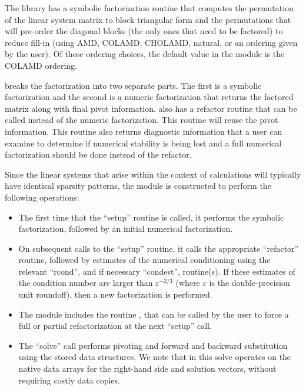 The {\klu} library has a symbolic factorization routine that computes
the permutation of the linear system matrix to block triangular form
and the permutations that will pre-order the diagonal blocks (the only
ones that need to be factored) to reduce fill-in (using AMD, COLAMD,
CHOLAMD, natural, or an ordering given by the user).  Of these
ordering choices, the default value in the {\sunlinsolklu} 
module is the COLAMD ordering.

{\klu} breaks the factorization into two separate parts.  The first is
a symbolic factorization and the second is a numeric factorization
that returns the factored matrix along with final pivot information.   
{\klu} also has a refactor routine that can be called instead of the numeric 
factorization.  This routine will reuse the pivot information.  This routine 
also returns diagnostic information that a user can examine to determine if 
numerical stability is being lost and a full numerical factorization should 
be done instead of the refactor.

Since the linear systems that arise within the context of {\sundials}
calculations will typically have identical sparsity patterns, the
{\sunlinsolklu} module is constructed to perform the
following operations:
\begin{itemize}
\item The first time that the ``setup'' routine is called, it
  performs the symbolic factorization, followed by an initial
  numerical factorization.  
\item On subsequent calls to the ``setup'' routine, it calls the
  appropriate {\klu} ``refactor'' routine, followed by estimates of
  the numerical conditioning using the relevant ``rcond'', and if
  necessary ``condest'', routine(s).  If these estimates of the
  condition number are larger than $\varepsilon^{-2/3}$ (where
  $\varepsilon$ is the double-precision unit roundoff), then a new
  factorization is performed.
\item The module includes the routine , that 
  can be called by the user to force a full or partial refactorization
  at the next ``setup'' call. 
\item The ``solve'' call performs pivoting and forward and
  backward substitution using the stored {\klu} data structures.  We
  note that in this solve {\klu} operates on the native data arrays
  for the right-hand side and solution vectors, without requiring
  costly data copies.
\end{itemize}


